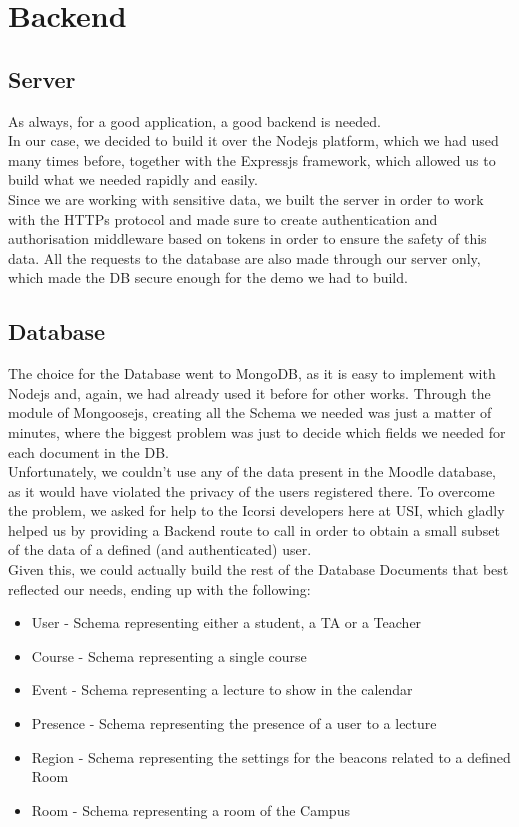 \section{Backend}

\subsection{Server}
As always, for a good application, a good backend is needed. \\
In our case, we decided to build it over the Nodejs platform, which we had used many times before, together with the Expressjs framework, which allowed us to build what we needed rapidly and easily.\\
Since we are working with sensitive data, we built the server in order to work with the HTTPs protocol and made sure to create authentication and authorisation middleware based on tokens in order to ensure the safety of this data. All the requests to the database are also made through our server only, which made the DB secure enough for the demo we had to build.

\subsection{Database}
The choice for the Database went to MongoDB, as it is easy to implement with Nodejs and, again, we had already used it before for other works. Through the module of Mongoosejs, creating all the Schema we needed was just a matter of minutes, where the biggest problem was just to decide which fields we needed for each document in the DB.\\
Unfortunately, we couldn't use any of the data present in the Moodle database, as it would have violated the privacy of the users registered there. To overcome the problem, we asked for help to the Icorsi developers here at USI, which gladly helped us by providing a Backend route to call in order to obtain a small subset of the data of a defined (and authenticated) user.\\
Given this, we could actually build the rest of the Database Documents that best reflected our needs, ending up with the following:\\
\begin{itemize}
\item User - Schema representing either a student, a TA or a Teacher
\item Course - Schema representing a single course 
\item Event - Schema representing a lecture to show in the calendar 
\item Presence - Schema representing the presence of a user to a lecture
\item Region - Schema representing the settings for the beacons related to a defined Room
\item Room - Schema representing a room of the Campus
\end{itemize}

